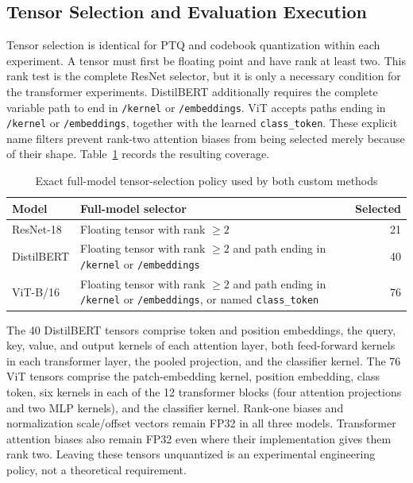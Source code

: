 \documentclass[conference]{IEEEtran}
\begin{document}
\subsection{Tensor Selection and Evaluation Execution}

Tensor selection is identical for PTQ and codebook quantization within each experiment. A tensor must first be floating point and have rank at least two. This rank test is the complete ResNet selector, but it is only a necessary condition for the transformer experiments. DistilBERT additionally requires the complete variable path to end in \texttt{/kernel} or \texttt{/embeddings}. ViT accepts paths ending in \texttt{/kernel} or \texttt{/embeddings}, together with the learned \texttt{class\_token}. These explicit name filters prevent rank-two attention biases from being selected merely because of their shape. Table~\ref{tab:tensor-selection} records the resulting coverage.

\begin{table}[t]
\caption{Exact full-model tensor-selection policy used by both custom methods}
\label{tab:tensor-selection}
\centering
\small
\begin{tabular}{@{}p{}p{}r@{}}
\toprule
Model & Full-model selector & Selected \tabularnewline
\midrule
ResNet-18 & Floating tensor with rank $\geq 2$ & 21 \tabularnewline
DistilBERT & Floating tensor with rank $\geq 2$ and path ending in \texttt{/kernel} or \texttt{/embeddings} & 40 \tabularnewline
ViT-B/16 & Floating tensor with rank $\geq 2$ and path ending in \texttt{/kernel} or \texttt{/embeddings}, or named \texttt{class\_token} & 76 \tabularnewline
\bottomrule
\end{tabular}
\end{table}

The 40 DistilBERT tensors comprise token and position embeddings, the query, key, value, and output kernels of each attention layer, both feed-forward kernels in each transformer layer, the pooled projection, and the classifier kernel. The 76 ViT tensors comprise the patch-embedding kernel, position embedding, class token, six kernels in each of the 12 transformer blocks (four attention projections and two MLP kernels), and the classifier kernel. Rank-one biases and normalization scale/offset vectors remain FP32 in all three models. Transformer attention biases also remain FP32 even where their implementation gives them rank two. Leaving these tensors unquantized is an experimental engineering policy, not a theoretical requirement.
\end{document}
